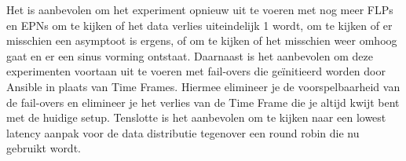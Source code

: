 Het is aanbevolen om het experiment opnieuw uit te voeren met nog meer FLPs en EPNs om te kijken of het data verlies uiteindelijk 1 wordt, om te kijken of er misschien een asymptoot is ergens, of om te kijken of het misschien weer omhoog gaat en er een sinus vorming ontstaat. Daarnaast is het aanbevolen om deze experimenten voortaan uit te voeren met fail-overs die geïnitieerd worden door Ansible in plaats van Time Frames. Hiermee elimineer je de voorspelbaarheid van de fail-overs en elimineer je het verlies van de Time Frame die je altijd kwijt bent met de huidige setup. Tenslotte is het aanbevolen om te kijken naar een lowest latency aanpak voor de data distributie tegenover een round robin die nu gebruikt wordt. 